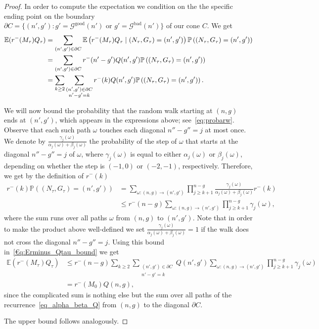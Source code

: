 \documentclass[a4paper,12pt]{article}
\theoremstyle{definition}
\newcommand{\good}[1]{\mathcal{G}^{\text{good}}({#1})}
\newcommand{\bad}[1]{\mathcal{G}^{\text{bad}}({#1})}
\begin{document}
\begin{proof}
 In order to compute the expectation we condition on the the specific ending point on the boundary $\partial C = \{ (n',g') : g'=\good{n'} \text{ or } g'=\bad{n'}\}$ of our cone $C$. 
    We get
    \begin{align}
        \mathbb{E}(r^{-}(M_{\tau})Q_\tau) 
            &= \sum_{(n',g') \in \partial C} \mathbb{E}\left(r^{-}(M_{\tau})Q_\tau \mid (N_{\tau},G_{\tau}) = (n',g')\right) \mathbb{P}\left( (N_{\tau},G_{\tau}) = (n',g') \right) \notag \\
            &= \sum_{(n',g') \in \partial C} r^{-}(n'-g') Q(n',g') \mathbb{P}\left( (N_{\tau},G_{\tau}) = (n',g') \right) \notag \\
            &= \sum_{k \geq 2} \sum_{\substack{(n',g') \in \partial C\\n'-g'=k}} r^{-}(k) Q(n',g') \mathbb{P}\left( (N_{\tau},G_{\tau}) = (n',g') \right).\label{€q:Erminus_Qtau_bound}
    \end{align}
  
    We will now bound the probability that the random walk starting at $(n,g)$ ends at $(n',g')$, which appears in the expressions above; see~\eqref{eq:probarw}.
    Observe that each such path $\omega$ touches each diagonal $n''-g''=j$ at most once. 
    We denote by $\frac{\gamma_{j}(\omega)}{\alpha_{j}(\omega)+\beta_{j}(\omega)}$ the probability of the step of $\omega$ that starts at the diagonal $n''-g''=j$ of $\omega$, where $\gamma_j(\omega)$ is equal to either $\alpha_j(\omega)$ or $\beta_j(\omega)$, depending on whether the step is $(-1,0)$ or $(-2,-1)$, respectively.
    Therefore, we get by the definition of $r^{-}(k)$
    \begin{align*}
        r^{-}(k) \mathbb{P}\left( (N_{\tau},G_{\tau}) = (n',g') \right) 
            &= \sum_{\omega: (n,g) \to (n',g')} \prod_{j \geq k+1}^{n-g} \frac{\gamma_{j}(\omega)}{\alpha_{j}(\omega)+\beta_{j}(\omega)} r^{-}(k)\\
            &\leq r^{-}(n-g) \sum_{\omega: (n,g) \to (n',g')} \prod_{j \geq k+1}^{n-g} \gamma_{j}(\omega),
    \end{align*}
    where the sum runs over all paths $\omega$ from $(n,g)$ to $(n',g')$.  
    Note that in order to make the product above well-defined we set $\frac{\gamma_j(\omega)}{\alpha_j(\omega)+\beta_j(\omega)}=1$ if the walk does not cross the diagonal $n''-g''=j$.
    Using this bound in~\eqref{€q:Erminus_Qtau_bound} we get
    \begin{align*}
        \mathbb{E}(r^{-}(M_{\tau})Q_\tau) 
            &\leq r^{-}(n-g) \sum_{k \geq 2} \sum_{\substack{(n',g') \in \partial C\\n'-g'=k}} Q(n',g') \sum_{\omega: (n,g) \to (n',g')} \prod_{j \geq k+1}^{n-g} \gamma_{j}(\omega) \\
            &= r^{-}(M_0) Q(n,g),
    \end{align*}
    since the complicated sum is nothing else but the sum over all paths of the recurrence~\eqref{eq_alpha_beta_Q} from $(n,g)$ to the diagonal $\partial C$. %
    
    The upper bound follows analogously.
\end{proof}
\end{document}

